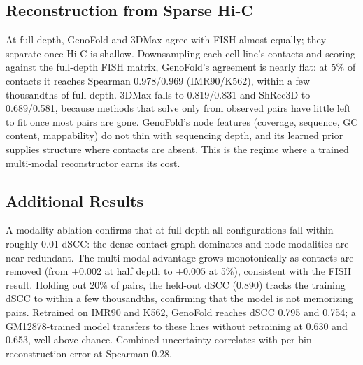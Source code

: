 \documentclass[conference]{IEEEtran}
\begin{document}
\subsection{Reconstruction from Sparse Hi-C}
At full depth, GenoFold and 3DMax agree with FISH almost equally; they
separate once Hi-C is shallow. Downsampling each cell line's contacts
and scoring against the full-depth FISH matrix, GenoFold's agreement is
nearly flat: at 5\% of contacts it reaches Spearman 0.978/0.969
(IMR90/K562), within a few thousandths of full depth. 3DMax falls to
0.819/0.831 and ShRec3D to 0.689/0.581, because methods that solve only
from observed pairs have little left to fit once most pairs are gone.
GenoFold's node features (coverage, sequence, GC content, mappability)
do not thin with sequencing depth, and its learned prior supplies
structure where contacts are absent. This is the regime where a trained
multi-modal reconstructor earns its cost.

%

\subsection{Additional Results}
A modality ablation confirms that at full depth all configurations fall
within roughly 0.01 dSCC: the dense contact graph dominates and node
modalities are near-redundant. The multi-modal advantage grows
monotonically as contacts are removed (from $+0.002$ at half depth to
$+0.005$ at 5\%), consistent with the FISH result. Holding out 20\% of
pairs, the held-out dSCC (0.890) tracks the training dSCC to within a
few thousandths, confirming that the model is not memorizing pairs.
Retrained on IMR90 and K562, GenoFold reaches dSCC 0.795 and 0.754; a
GM12878-trained model transfers to these lines without retraining at
0.630 and 0.653, well above chance. Combined uncertainty correlates with
per-bin reconstruction error at Spearman 0.28.
\end{document}
